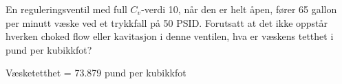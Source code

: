 

En reguleringsventil med full $C_v$-verdi 10, når den er helt åpen, fører 65 gallon per minutt væske ved et trykkfall på 50 PSID. Forutsatt at det ikke oppstår hverken choked flow eller kavitasjon i denne ventilen, hva er væskens tetthet i pund per kubikkfot?







Væsketetthet = 73.879 pund per kubikkfot









